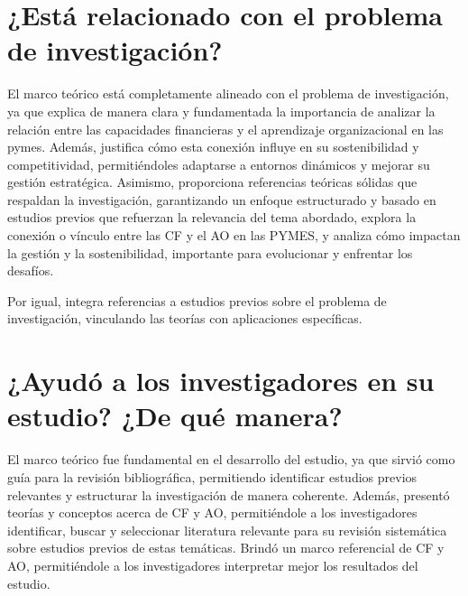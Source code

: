 \documentclass[letterpaper, 11pt]{report}
\begin{document}
\section*{¿Está relacionado con el problema de investigación?}

El marco teórico está completamente alineado con el problema de investigación,
ya que explica de manera clara y fundamentada la importancia de analizar la
relación entre las capacidades financieras y el aprendizaje organizacional en
las pymes. Además, justifica cómo esta conexión influye en su sostenibilidad y
competitividad, permitiéndoles adaptarse a entornos dinámicos y mejorar su
gestión estratégica. Asimismo, proporciona referencias teóricas sólidas que
respaldan la investigación, garantizando un enfoque estructurado y basado en
estudios previos que refuerzan la relevancia del tema abordado, explora la
conexión o vínculo entre las CF y el AO en las PYMES, y analiza cómo impactan
la gestión y la sostenibilidad, importante para evolucionar y enfrentar los
desafíos.

Por igual, integra referencias a estudios previos sobre el problema de
investigación, vinculando las teorías con aplicaciones específicas.

\section*{¿Ayudó a los investigadores en su estudio? ¿De qué manera?}

El marco teórico fue fundamental en el desarrollo del estudio, ya que sirvió
como guía para la revisión bibliográfica, permitiendo identificar estudios
previos relevantes y estructurar la investigación de manera coherente. Además,
presentó teorías y conceptos acerca de CF y AO, permitiéndole a los
investigadores identificar, buscar y seleccionar literatura relevante para su
revisión sistemática sobre estudios previos de estas temáticas. Brindó un marco
referencial de CF y AO, permitiéndole a los investigadores interpretar mejor
los resultados del estudio.

\printbibliography
\end{document}
